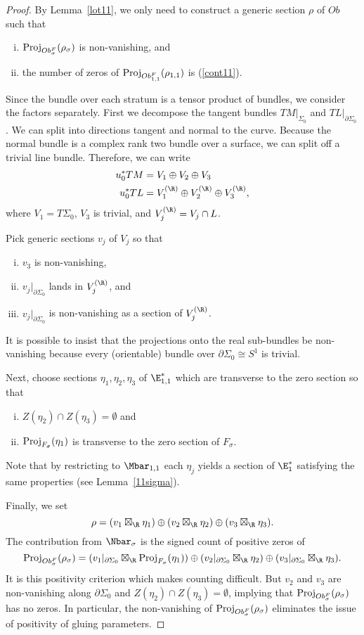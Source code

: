 \begin{proposition}
\begin{proof}
By Lemma~\ref{lot11}, we only need to construct a generic section $\rho$ of $Ob$ such that
\begin{enumerate}[(i)]
\item $\operatorname{Proj}_{Ob_\sigma^F}(\rho_\sigma)$ is non-vanishing, and
\item the number of zeros of $\operatorname{Proj}_{Ob_{1,1}^F}(\rho_{1,1})$ is (\ref{cont11}).
\end{enumerate}

Since the bundle over each stratum is a tensor product of bundles, we consider the factors separately. First we decompose the tangent bundles $TM|_{\Sigma_0}$ and $TL|_{\partial\Sigma_0}$. We can split into directions tangent and normal to the curve. Because the normal bundle is a complex rank two bundle over a surface, we can split off a trivial line bundle. Therefore, we can write
\begin{align*}
u_0^*TM & = V_1 \oplus V_2 \oplus V_3
\\
u_0^*TL & = V_1^{(\R)} \oplus V_2^{(\R)} \oplus V_3^{(\R)},
\end{align*}
where $V_1=T\Sigma_0$, $V_3$ is trivial, and $V_j^{(\R)}=V_j \cap L$. 

Pick generic sections $v_j$ of $V_j$ so that
\begin{enumerate}[(i)]
\item $v_3$ is non-vanishing,
\item $v_j|_{\partial\Sigma_0}$ lands in $V_j^{(\R)}$, and
\item $v_j|_{\partial\Sigma_0}$ is non-vanishing as a section of $V_j^{(\R)}$.
\end{enumerate}
It is possible to insist that the projections onto the real sub-bundles be non-vanishing because every (orientable) bundle over $\partial\Sigma_0 \cong S^1$ is trivial.

Next, choose sections $\eta_1,\eta_2,\eta_3$ of $\E_{1,1}^*$ which are transverse to the zero section so that
\begin{enumerate}[(i)]
\item $Z(\eta_2) \cap Z(\eta_3) = \emptyset$ and
\item $\operatorname{Proj}_{F_\sigma}(\eta_1)$ is transverse to the zero section of $F_\sigma$.
\end{enumerate}
Note that by restricting to $\Mbar_{1,1}$ each $\eta_j$ yields a section of $\E_1^*$ satisfying the same properties (see Lemma~\ref{11sigma}).

Finally, we set
\[
\rho = (v_1 \boxtimes_\R \eta_1) \oplus (v_2 \boxtimes_\R \eta_2) \oplus (v_3 \boxtimes_\R \eta_3).
\]
The contribution from $\Nbar_\sigma$ is the signed count of positive zeros of
\[
\proj_{Ob_\sigma^F}(\rho_\sigma) = (v_1|_{\partial\Sigma_0} \boxtimes_\R \proj_{F_\sigma}(\eta_1)) \oplus (v_2|_{\partial\Sigma_0} \boxtimes_\R \eta_2) \oplus (v_3|_{\partial\Sigma_0} \boxtimes_\R \eta_3).
\]
It is this positivity criterion which makes counting difficult. 
But $v_2$ and $v_3$ are non-vanishing along $\partial\Sigma_0$ and $Z(\eta_2) \cap Z(\eta_3) = \emptyset$, implying that $\operatorname{Proj}_{Ob_\sigma^F}(\rho_\sigma)$ has no zeros. In particular, the non-vanishing of $\operatorname{Proj}_{Ob_\sigma^F}(\rho_\sigma)$ eliminates the issue of positivity of gluing parameters.


\end{proof}
\end{proposition}
